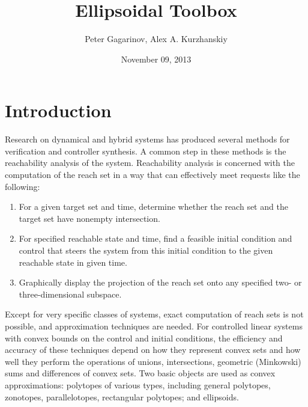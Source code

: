\documentclass[letterpaper,10pt,english]{sphinxmanual}
\title{Ellipsoidal Toolbox}
\date{November 09, 2013}
\author{Peter Gagarinov, Alex A. Kurzhanskiy}
\begin{document}
\maketitle
\tableofcontents
{}\label{main_manual::doc}



\chapter{Introduction}
\label{chap_intro:introduction}\label{chap_intro::doc}\label{chap_intro:welcome-to-ellipsoidal-toolbox-documentation}
Research on dynamical and hybrid systems has produced several methods
for verification and controller synthesis. A common step in these
methods is the reachability analysis of the system. Reachability
analysis is concerned with the computation of the reach set in a way
that can effectively meet requests like the following:
\begin{enumerate}
\item {} 
For a given target set and time, determine whether the reach set and
the target set have nonempty intersection.

\item {} 
For specified reachable state and time, find a feasible initial
condition and control that steers the system from this initial
condition to the given reachable state in given time.

\item {} 
Graphically display the projection of the reach set onto any
specified two- or three-dimensional subspace.

\end{enumerate}

Except for very specific classes of systems, exact computation of reach
sets is not possible, and approximation techniques are needed. For
controlled linear systems with convex bounds on the control and initial
conditions, the efficiency and accuracy of these techniques depend on
how they represent convex sets and how well they perform the operations
of unions, intersections, geometric (Minkowski) sums and differences of
convex sets. Two basic objects are used as convex approximations:
polytopes of various types, including general polytopes, zonotopes,
parallelotopes, rectangular polytopes; and ellipsoids.
\end{document}

